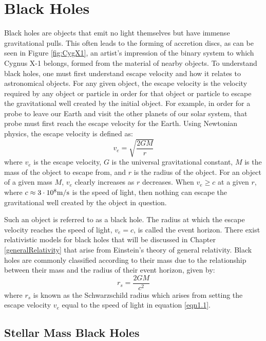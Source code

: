 \documentclass[12pt, oneside]{smuthesis}
\begin{document}
\section{\sc Black Holes} \label{blackHole}

Black holes are objects that emit no light themselves but have immense gravitational pulls. This often leads to the forming of accretion discs, as can be seen in Figure \ref{fig:CygX1}, an artist's impression of the binary system to which Cygnus X-1 belongs, formed from the material of nearby objects. To understand black holes, one must first understand escape velocity and how it relates to astronomical objects. For any given object, the escape velocity is the velocity required by any object or particle in order for that object or particle to escape the gravitational well created by the initial object. For example, in order for a probe to leave our Earth and visit the other planets of our solar system, that probe must first reach the escape velocity for the Earth. Using Newtonian physics, the escape velocity is defined as:
\begin{equation} \label{eqn1.1}
v_{e} = \sqrt{\frac{2GM}{r}}
\end{equation}
where $v_{e}$ is the escape velocity, $G$ is the universal gravitational constant, $M$ is the mass of the object to escape from, and $r$ is the radius of the object. For an object of a given mass $M$, $v_{e}$ clearly increases as $r$ decreases. When $v_{e} \geq c$ at a given $r$, where $c \approx 3\cdot10^{8} \textup{m}/\textup{s}$ is the speed of light, then nothing can escape the gravitational well created by the object in question.

Such an object is referred to as a black hole. The radius at which the escape velocity reaches the speed of light, $v_{e} = c$, is called the event horizon. There exist relativistic models for black holes that will be discussed in Chapter \ref{generalRelativity} that arise from Einstein's theory of general relativity. Black holes are commonly classified according to their mass due to the relationship between their mass and the radius of their event horizon, given by:
\begin{equation} \label{eqn1.2}
r_{s} = \frac{2GM}{c^{2}}
\end{equation}
where $r_{s}$ is known as the Schwarzschild radius which arises from setting the escape velocity $v_{e}$ equal to the speed of light in equation \ref{eqn1.1}.

\subsection{\sc Stellar Mass Black Holes} \label{stellarBH}
\end{document}

